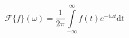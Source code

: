 \documentclass[14pt]{article}
\begin{document}
\pagestyle{empty}
\[ \mathcal{F}\{f\}(\omega)  = \frac{1}{2\pi} \int\limits_{-\infty}^{\infty} f(t) e^{-i\omega t} \mathrm dt\]
\end{document}
